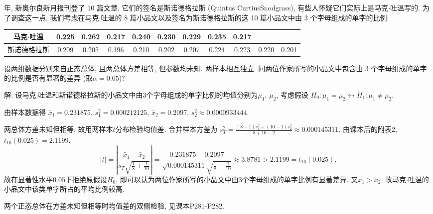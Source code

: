 \documentclass[standard]{ExBook}
\renewenvironment{shaded}{%
  \def\FrameCommand{\fboxsep=\FrameSep \colorbox{shadecolor}}%
  \MakeFramed{\advance\hsize-\width \FrameRestore}%
}{%
  \endMakeFramed
}
\begin{document}
\begin{qitems}
\vspace{2.5cm-5em}

    \begin{bbox}
    \begin{shaded}
         年, 新奥尔良新月报刊登了 10 篇文章, 它们的签名是斯诺德格拉斯 (Quintus CurtiusSnodgrass), 有些人怀疑它们实际上是马克$\cdot$吐温写的. 为了调查这一点, 我们考虑在马克$\cdot$吐温的 8 篇小品文以及签名为斯诺德格拉斯的这 10 篇小品文中由 3 个字母组成的单字的比例:
\begin{center}
\setlength{\tabcolsep}{6pt}
\begin{tabular}{c|cccccccccc}
\hline
马克$\cdot$吐温 & 0.225 & 0.262 & 0.217 & 0.240 & 0.230 & 0.229 & 0.235 & 0.217 &  &  \\
\hline
斯诺德格拉斯 & 0.209 & 0.205 & 0.196 & 0.210 & 0.202 & 0.207 & 0.224 & 0.223 & 0.220 & 0.201 \\
\hline
\end{tabular}
\end{center}
设两组数据分别来自正态总体, 且两总体方差相等, 但参数均未知. 两样本相互独立. 问两位作家所写的小品文中包含由 3 个字母组成的单字的比例是否有显著的差异 (取$\alpha=0.05$)?
    \end{shaded}
    \end{bbox}

\vspace{\dimexpr2.5cm-5em\relax}

解: 设马克$\cdot$吐温和斯诺德格拉斯的小品文中由3个字母组成的单字比例的均值分别为$\mu_1$, $\mu_2$, 考虑假设
$
H_0:\mu_1=\mu_2
\longleftrightarrow
H_1:\mu_1\neq\mu_2
$.

由样本数据得
$
\bar{x}_1=0.231875
$,
$
s_1^2=0.000212125
$,
$
\bar{x}_2=0.2097
$,
$
s_2^2\approx0.0000933444
$.

两总体方差未知但相等, 故用两样本$t$分布检验均值差. 合并样本方差为
$
s_T^2
=
\frac{(8-1)s_1^2+(10-1)s_2^2}{8+10-2}
\approx0.000145311
$.
由课本后的附表2, $t_{16}(0.025)=2.1199$.
$$
|t|
=
\left|
\frac{\bar{x}_1-\bar{x}_2}
{s_T\sqrt{\frac{1}{8}+\frac{1}{10}}}
\right|
=
\frac{0.231875-0.2097}
{\sqrt{0.000145311}\sqrt{\frac{1}{8}+\frac{1}{10}}}
\approx3.8781
>
2.1199
=
t_{16}(0.025).
$$
故在显著性水平$0.05$下拒绝原假设$H_0$, 即可以认为两位作家所写的小品文中由3个字母组成的单字比例有显著差异. 又$\bar{x}_1>\bar{x}_2$, 故马克$\cdot$吐温的小品文中该类单字所占的平均比例较高.

\textcolor{themeColor}{\selectfont {} 两个正态总体在方差未知但相等时均值差的双侧检验, 见课本P281-P282.}


\end{qitems}
\end{document}
